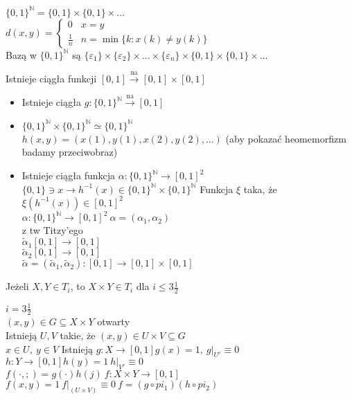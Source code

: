 \begin{prz} 
    $\{0,1\}^\mathbb N = \{0,1\} \times \{0,1\} \times \ldots$ \\ 
    $d(x,y) = \begin{cases} 0 & x = y \\ \frac{1}{n} & n = \min \{k: x(k) \neq y(k)\} \end{cases}$ \\ 
    Bazą w $\{0,1\}^\mathbb N$ są $\{\varepsilon_1\} \times \{\varepsilon_2\} \times 
    \ldots \times \{\varepsilon_n\} \times \{0,1\} \times \{0,1\} \times \ldots$
\end{prz}      
\begin{prz} 
    Istnieje ciągła funkcji $[0,1] \xrightarrow{\text{na}} [0,1] \times [0,1]$
    \begin{dd}\hfill 
        \begin{itemize} 
            \item Istnieje ciągła $g: \{0,1\}^\mathbb N \xrightarrow{\text{na}} [0,1]$
            \item $\{0,1\} ^\mathbb N \times \{0,1\}^ \mathbb N \simeq \{0,1\}^\mathbb N$ \\ 
                $h(x,y) = (x(1),y(1),x(2),y(2),\ldots)$ (aby pokazać heomemorfizm badamy przeciwobraz)
            \item Istnieje ciągła funkcja $\alpha: \{0,1\}^\mathbb N \to [0,1]^2$ \\ 
                $\{0,1\} \ni x \to h^{-1} (x) \in \{0,1\}^\mathbb N \times \{0,1\}^\mathbb N$ 
                Funkcja $\xi$ taka, że $\xi(h^{-1} (x)) \in [0,1]^2$ \\ 
                $\alpha : \{0,1\}^\mathbb N \to [0,1]^2 \ \alpha = (\alpha_1,\alpha_2)$ \\ 
                z tw Titzy'ego \\ 
                $\widetilde \alpha_1 [0,1] \to [0,1]$ \\ 
                $\widetilde \alpha_2 [0,1] \to [0,1]$ \\ 
                $\widetilde \alpha = (\widetilde \alpha_1,\widetilde \alpha_2): 
                [0,1] \to [0,1] \times [0,1]$
        \end{itemize} 
    \end{dd}
\end{prz} 
\begin{tw} Jeżeli $X,Y \in T_i$, to $X \times Y \in T_i$ dla $i \le 3\frac{1}{2}$ \end{tw} 
\begin{dd} $i = 3\frac{1}{2}$ \\ 
    $(x,y) \in G \subseteq X \times Y$ otwarty \\ 
    Istnieją $U,V$ takie, że $(x,y) \in U \times V \subseteq G$ \\ 
    $x \in U,\ y \in V$ Istnieją $g: X \to [0,1] g(x) = 1,\ g|_{U^c} \equiv 0$ \\ 
    $h: Y \to [0,1] h(y) = 1 \ h|_{V^c} \equiv 0$ \\ 
    $f(\cdot,;) = g(\cdot)h(j) \ f: X \times Y \to [0,1]$ \\ 
    $f(x,y) = 1 \ f|_{(U \times V)} \equiv 0 \ f = (g \circ pi_1)(h \circ pi_2)$
\end{dd} 
